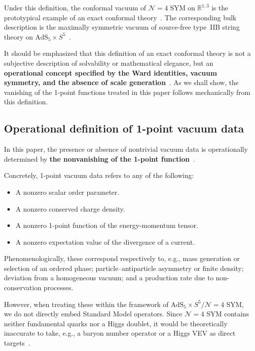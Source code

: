 \documentclass[
  aps,
  prd,
  preprint,
  groupedaddress,
  nofootinbib,
  longbibliography
]{revtex4-2}
\theoremstyle{remark}
\newcommand{\N}{\mathcal{N}}
\newcommand{\AdS}{\mathrm{AdS}}
\begin{document}
Under this definition, the conformal vacuum of $\N=4$ SYM
on $\mathbb{R}^{1,3}$ is the prototypical example of an
exact conformal
theory~\cite{ref4,ref6,ref7,ref13,ref14}.
The corresponding bulk description is the maximally symmetric
vacuum of source-free type~IIB string theory
on $\AdS_5\times S^5$~\cite{ref1,ref2,ref3,ref4}.

It should be emphasized that this definition of an exact
conformal theory is not a subjective description of solvability
or mathematical elegance, but an \textbf{operational concept
specified by the Ward identities, vacuum symmetry, and the
absence of scale generation}~\cite{ref6,ref13,ref14}.
As we shall show, the vanishing of the 1-point functions
treated in this paper follows mechanically from this definition.

\subsection{Operational definition of 1-point vacuum data}\label{subsec:1-4}

In this paper, the presence or absence of nontrivial vacuum
data is operationally determined by \textbf{the nonvanishing
of the 1-point function}~\cite{ref2,ref3,ref5,ref9,ref10}.

Concretely, 1-point vacuum data refers to any of the following:

\begin{itemize}
\item A nonzero scalar order parameter.
\item A nonzero conserved charge density.
\item A nonzero 1-point function of the energy-momentum tensor.
\item A nonzero expectation value of the divergence of a current.
\end{itemize}

Phenomenologically, these correspond respectively to, e.g.,
mass generation or selection of an ordered phase;
particle--antiparticle asymmetry or finite density;
deviation from a homogeneous vacuum;
and a production rate due to non-conservation processes.

However, when treating these within the framework of
$\AdS_5\times S^5/\N=4$ SYM, we do not directly embed
Standard Model operators.
Since $\N=4$ SYM contains neither fundamental quarks nor a
Higgs doublet, it would be theoretically inaccurate to take,
e.g., a baryon number operator or a Higgs VEV as direct
targets~\cite{ref4,ref7,ref8}.
\end{document}
